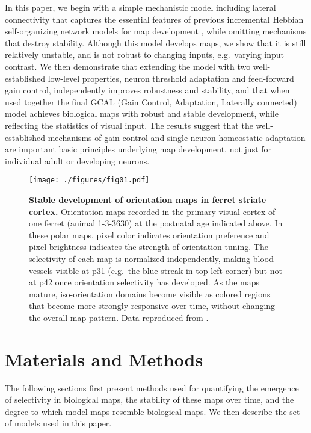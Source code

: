 \documentclass{article}
\def \scalefactor {0.666666}
\def \chapmanScale {\scalefactor}          %
\begin{document}
In this paper, we begin with a simple mechanistic model including
lateral connectivity that captures the essential features of previous
incremental Hebbian self-organizing network models for map development
\citep{vondermalsburg:selforg,kohonen:original,Obermayer1990,Sirosh1994a,barrow:nc96,Burger1999,Burger2001,bednar:neurocomputing04-or,Miikkulainen2005},
while omitting mechanisms that destroy stability. Although this model
develops maps, we show that it is still relatively unstable, and is
not robust to changing inputs, e.g.\ varying input contrast. We then
demonstrate that extending the model with two well-established
low-level properties, neuron threshold adaptation and feed-forward
gain control, independently improves robustness and stability, and
that when used together the final GCAL (Gain Control, Adaptation,
Laterally connected) model achieves biological maps with robust and
stable development, while reflecting the statistics of visual input.
The results suggest that the well-established mechanisms of gain
control and single-neuron homeostatic adaptation are important basic
principles underlying map development, not just for individual adult
or developing neurons.
\begin{figure}
\centerline{
\texttt{[image: ./figures/fig01.pdf]}
}

\caption[]{{\bf Stable development of orientation maps in ferret
    striate cortex.} Orientation maps recorded in the primary visual
  cortex of one ferret (animal 1-3-3630) at the postnatal age
  indicated above. In these polar maps, pixel color indicates
  orientation preference and pixel brightness indicates the strength
  of orientation tuning. The selectivity of each map is normalized
  independently, making blood vessels visible at p31 (e.g.\ the blue
  streak in top-left corner) but not at p42 once orientation
  selectivity has developed.  As the maps mature, iso-orientation
  domains become visible as colored regions that become more strongly
  responsive over time, without changing the overall map pattern.
  Data reproduced from \citealt{Chapman1996}.}
\label{fig:ferret_stability}
\end{figure}

\section{Materials and Methods}
\small

The following sections first present methods used for quantifying the
emergence of selectivity in biological maps, the stability of these maps over
time, and the degree to which model maps resemble biological maps. We then
describe the set of models used in this paper.
\end{document}
